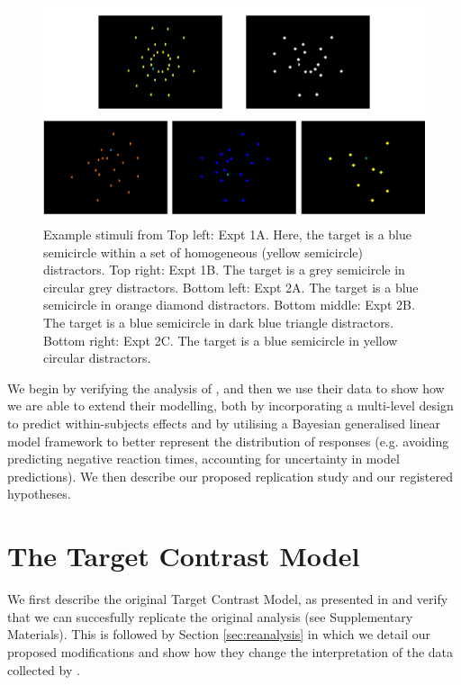 \documentclass[preprint,12pt,authoryear]{elsarticle}
\begin{document}
\begin{figure}[ht]
\centering
\includegraphics[width=\textwidth]{../plots/example_stimuli_figure.pdf}
\caption{Example stimuli from \cite{buetti2019predicting} Top left: Expt 1A. Here, the target is a blue semicircle within a set of homogeneous (yellow semicircle) distractors. Top right: Expt 1B. The target is a grey semicircle in circular grey distractors. Bottom left: Expt 2A. The target is a blue semicircle in orange diamond distractors. Bottom middle: Expt 2B. The target is a blue semicircle in dark blue triangle distractors. Bottom right: Expt 2C. The target is a blue semicircle in yellow circular distractors.}
\label{fig:buetti2019_stimulus}
\end{figure}

We begin by verifying the analysis of \cite{buetti2019predicting}, and then we use their data to show how we are able to extend their modelling, both by incorporating a multi-level design to predict within-subjects effects and by utilising a Bayesian generalised linear model framework to better represent the distribution of responses (e.g. avoiding predicting negative reaction times, accounting for uncertainty in model predictions). We then describe our proposed replication study and our registered hypotheses.

\section{The Target Contrast Model}
\label{sec:reansalysis}

We first describe the original Target Contrast Model, as presented in \cite{buetti2019predicting} and verify that we can succesfully replicate the original analysis (see Supplementary Materials). This is followed by Section \ref{sec:reanalysis} in which we detail our proposed modifications and show how they change the interpretation of the data collected by \cite{buetti2019predicting}.
\end{document}
